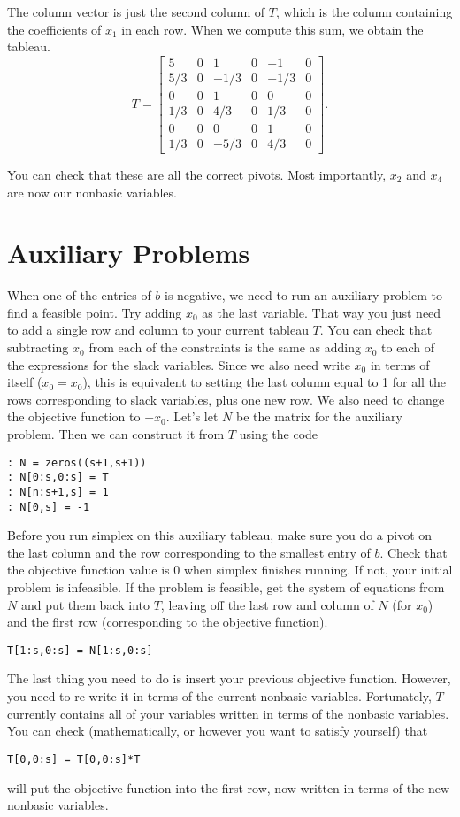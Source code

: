 The column vector is just the second column of $T$, which is the column containing the coefficients of $x_1$ in each row.
When we compute this sum, we obtain the tableau.
\[
	T = \begin{bmatrix}
		5 &  0 & 1 & 0 & -1 & 0 \\
		5/3 & 0 &-1/3 & 0 &-1/3 & 0 \\
		0 & 0 & 1 & 0 & 0 & 0 \\
		1/3 & 0 & 4/3 & 0 & 1/3 & 0 \\
		0 & 0 & 0 & 0 & 1 & 0 \\
		1/3 & 0 & -5/3 & 0 & 4/3 & 0
	\end{bmatrix}.
\]

You can check that these are all the correct pivots.
Most importantly, $x_2$ and $x_4$ are now our nonbasic variables.

\section*{Auxiliary Problems}

When one of the entries of $b$ is negative, we need to run an auxiliary problem to find a feasible point.
Try adding $x_0$ as the last variable.
That way you just need to add a single row and column to your current tableau $T$.
You can check that subtracting $x_0$ from each of the constraints is the same as adding $x_0$ to each of the expressions for the slack variables.
Since we also need write $x_0$ in terms of itself ($x_0 = x_0$), this is equivalent to setting the last column equal to 1 for all the rows corresponding to slack variables, plus one new row.
We also need to change the objective function to $-x_0$.
Let's let $N$ be the matrix for the auxiliary problem.
Then we can construct it from $T$ using the code 
\begin{lstlisting}[style=python]
: N = zeros((s+1,s+1))
: N[0:s,0:s] = T
: N[n:s+1,s] = 1
: N[0,s] = -1
\end{lstlisting}

Before you run simplex on this auxiliary tableau, make sure you do a pivot on the last column and the row corresponding to the smallest entry of $b$.
Check that the objective function value is 0 when simplex finishes running.
If not, your initial problem is infeasible.
If the problem is feasible, get the system of equations from $N$ and put them back into $T$, leaving off the last row and column of $N$ (for $x_0$) and the first row (corresponding to the objective function).
\begin{lstlisting}[style=python]
T[1:s,0:s] = N[1:s,0:s]
\end{lstlisting}
The last thing you need to do is insert your previous objective function.
However, you need to re-write it in terms of the current nonbasic variables.
Fortunately, $T$ currently contains all of your variables written in terms of the nonbasic variables.
You can check (mathematically, or however you want to satisfy yourself) that
\begin{lstlisting}[style=python]
T[0,0:s] = T[0,0:s]*T
\end{lstlisting}
will put the objective function into the first row, now written in terms of the new nonbasic variables.

